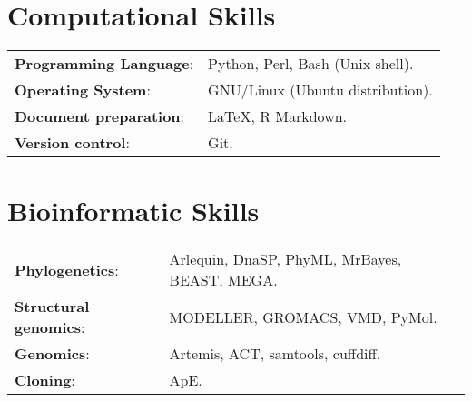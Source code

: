 \documentclass[margin,line]{res}
\begin{document}
\begin{resume}
\section{\sc Computational Skills}
\begin{tabular}{ l l}
	{\bf Programming Language}: & Python, Perl, Bash (Unix shell).\\
	{\bf Operating System}: & GNU/Linux (Ubuntu distribution).\\ %
	{\bf Document preparation}: & \LaTeX, R Markdown.\\ %
	{\bf Version control}: & Git.%
\end{tabular}

\section{\sc Bioinformatic Skills}
\begin{tabular}{l l}
	{\bf Phylogenetics}: & Arlequin, DnaSP, PhyML, MrBayes, BEAST, MEGA.\\
	{\bf Structural genomics}: & MODELLER, GROMACS, VMD, PyMol.\\
	{\bf Genomics}: & Artemis, ACT, samtools, cuffdiff.\\
	{\bf Cloning}: & ApE.%
\end{tabular}



\end{resume}
\end{document}

